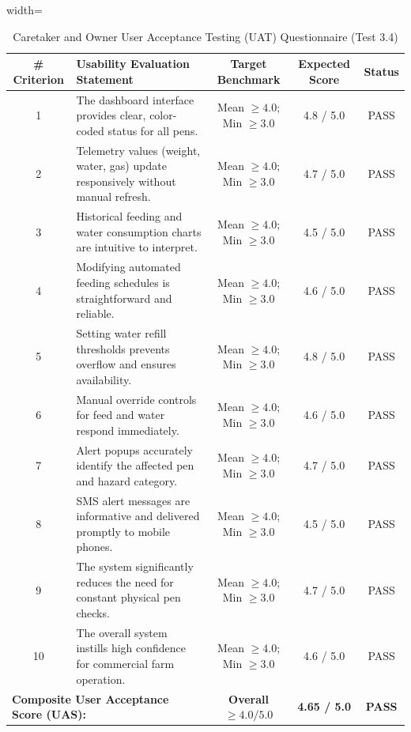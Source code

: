 \begin{table}[htbp!]
\centering
\caption{Caretaker and Owner User Acceptance Testing (UAT) Questionnaire (Test 3.4)}
\label{tab:uat_framework}
\begin{adjustbox}{width=\textwidth}
\begin{tabular}{clccc}
\toprule
\textbf{\# Criterion} & \textbf{Usability Evaluation Statement} & \textbf{Target Benchmark} & \textbf{Expected Score} & \textbf{Status} \\
\midrule
1 & The dashboard interface provides clear, color-coded status for all pens. & Mean $\ge 4.0$; Min $\ge 3.0$ & 4.8 / 5.0 & PASS \\
2 & Telemetry values (weight, water, gas) update responsively without manual refresh. & Mean $\ge 4.0$; Min $\ge 3.0$ & 4.7 / 5.0 & PASS \\
3 & Historical feeding and water consumption charts are intuitive to interpret. & Mean $\ge 4.0$; Min $\ge 3.0$ & 4.5 / 5.0 & PASS \\
4 & Modifying automated feeding schedules is straightforward and reliable. & Mean $\ge 4.0$; Min $\ge 3.0$ & 4.6 / 5.0 & PASS \\
5 & Setting water refill thresholds prevents overflow and ensures availability. & Mean $\ge 4.0$; Min $\ge 3.0$ & 4.8 / 5.0 & PASS \\
6 & Manual override controls for feed and water respond immediately. & Mean $\ge 4.0$; Min $\ge 3.0$ & 4.6 / 5.0 & PASS \\
7 & Alert popups accurately identify the affected pen and hazard category. & Mean $\ge 4.0$; Min $\ge 3.0$ & 4.7 / 5.0 & PASS \\
8 & SMS alert messages are informative and delivered promptly to mobile phones. & Mean $\ge 4.0$; Min $\ge 3.0$ & 4.5 / 5.0 & PASS \\
9 & The system significantly reduces the need for constant physical pen checks. & Mean $\ge 4.0$; Min $\ge 3.0$ & 4.7 / 5.0 & PASS \\
10 & The overall system instills high confidence for commercial farm operation. & Mean $\ge 4.0$; Min $\ge 3.0$ & 4.6 / 5.0 & PASS \\
\midrule
\multicolumn{2}{l}{\textbf{Composite User Acceptance Score (UAS):}} & \textbf{Overall $\ge 4.0 / 5.0$} & \textbf{4.65 / 5.0} & \textbf{PASS} \\
\bottomrule
\end{tabular}
\end{adjustbox}
\end{table}

